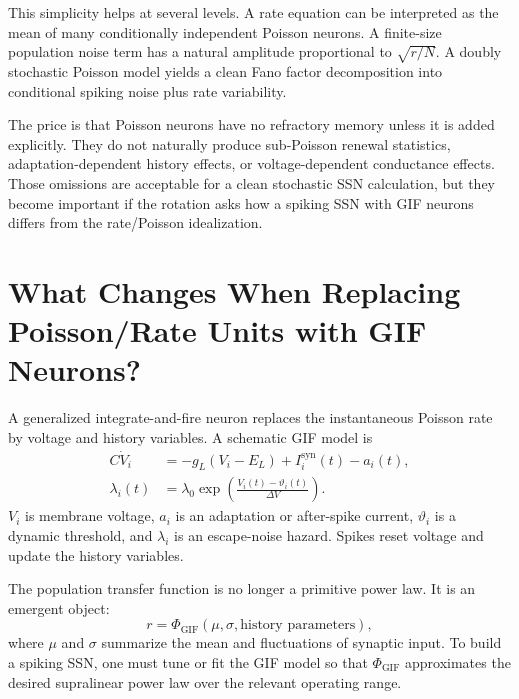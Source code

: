 This simplicity helps at several levels. A rate equation can be interpreted as the mean of many conditionally independent Poisson neurons. A finite-size population noise term has a natural amplitude proportional to $\sqrt{r/N}$. A doubly stochastic Poisson model yields a clean Fano factor decomposition into conditional spiking noise plus rate variability.

The price is that Poisson neurons have no refractory memory unless it is added explicitly. They do not naturally produce sub-Poisson renewal statistics, adaptation-dependent history effects, or voltage-dependent conductance effects. Those omissions are acceptable for a clean stochastic SSN calculation, but they become important if the rotation asks how a spiking SSN with GIF neurons differs from the rate/Poisson idealization.

\section{What Changes When Replacing Poisson/Rate Units with GIF Neurons?}
\label{sec:ssn-replacing-poisson-rate-with-gif}

A generalized integrate-and-fire neuron replaces the instantaneous Poisson rate by voltage and history variables. A schematic GIF model is
%
\begin{align}
  C\dot V_i
  &=
  -g_L(V_i-E_L)
  +
  I_i^{\mathrm{syn}}(t)
  -
  a_i(t),
  \label{eq:gif-voltage-ch15}\\
  \lambda_i(t)
  &=
  \lambda_0
  \exp\!\left(
    \frac{V_i(t)-\vartheta_i(t)}{\Delta V}
  \right).
  \label{eq:gif-hazard-ch15}
\end{align}
%
$V_i$ is membrane voltage, $a_i$ is an adaptation or after-spike current, $\vartheta_i$ is a dynamic threshold, and $\lambda_i$ is an escape-noise hazard. Spikes reset voltage and update the history variables.

The population transfer function is no longer a primitive power law. It is an emergent object:
%
\begin{equation}
  r
  =
  \Phi_{\mathrm{GIF}}(\mu,\sigma,\text{history parameters}),
  \label{eq:gif-transfer-emergent}
\end{equation}
%
where $\mu$ and $\sigma$ summarize the mean and fluctuations of synaptic input. To build a spiking SSN, one must tune or fit the GIF model so that $\Phi_{\mathrm{GIF}}$ approximates the desired supralinear power law over the relevant operating range.

